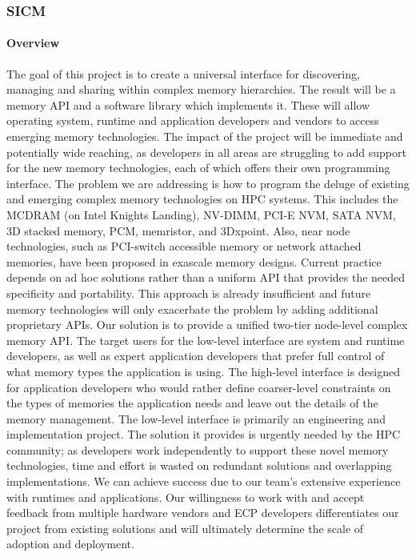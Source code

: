 \subsubsection{ SICM} 
\paragraph{Overview} The goal of this project is to create a universal interface for discovering, managing and sharing within complex memory hierarchies. The result will be a memory API and a software library which implements it. These will allow operating system, runtime and application developers and vendors to access emerging memory technologies. The impact of the project will be immediate and potentially wide reaching, as developers in all areas are struggling to add support for the new memory technologies, each of which offers their own programming interface. The problem we are addressing is how to program the deluge of existing and emerging complex memory technologies on HPC systems. This includes the MCDRAM (on Intel Knights Landing), NV-DIMM, PCI-E NVM, SATA NVM, 3D stacked memory, PCM, memristor, and 3Dxpoint. Also, near node technologies, such as PCI-switch accessible memory or network attached memories, have been proposed in exascale memory designs. Current practice depends on ad hoc solutions rather than a uniform API that provides the needed specificity and portability. This approach is already insufficient and future memory technologies will only exacerbate the problem by adding additional proprietary APIs. Our solution is to provide a unified two-tier node-level complex memory API. The target users for the low-level interface are system and runtime developers, as well as expert application developers that prefer full control of what memory types the application is using. The high-level interface is designed for application developers who would rather define coarser-level constraints on the types of memories the application needs and leave out the details of the memory management. The low-level interface is primarily an engineering and implementation project. The solution it provides is urgently needed by the HPC community; as developers work independently to support these novel memory technologies, time and effort is wasted on redundant solutions and overlapping implementations. We can achieve success due to our team’s extensive experience with runtimes and applications. Our willingness to work with and accept feedback from multiple hardware vendors and ECP developers differentiates our project from existing solutions and will ultimately determine the scale of adoption and deployment. 
